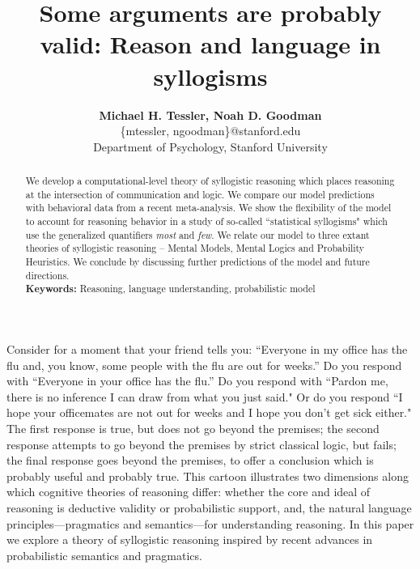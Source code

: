 \documentclass[10pt,letterpaper]{article}
\begin{document}
\title{Some arguments are probably valid: Reason and language in syllogisms}
 
\author{{\large \bf Michael H. Tessler, Noah D. Goodman } \\
	\{mtessler, ngoodman\}@stanford.edu \\
  Department of Psychology, Stanford University}

\maketitle


\begin{abstract}
We develop a computational-level theory of syllogistic reasoning which places reasoning at the intersection of communication and logic. We compare our model predictions with behavioral data from a recent meta-analysis. We show the flexibility of the model to account for reasoning behavior in a study of so-called ``statistical syllogisms" which use the generalized quantifiers \emph{most} and \emph{few}. We relate our model to three extant theories of syllogistic reasoning -- Mental Models, Mental Logics and Probability Heuristics. We conclude by discussing further predictions of the model and future directions.  
\\
\textbf{Keywords:} 
Reasoning, language understanding, probabilistic model
\end{abstract}


Consider for a moment that your friend tells you:
``Everyone in my office has the flu and, you know, some people with the flu are out for weeks.''
Do you respond with
``Everyone in your office has the flu.''
Do you respond with
``Pardon me, there is no inference I can draw from what you just said."
Or do you respond
 ``I hope your officemates are not out for weeks and I hope you don't get sick either."
 The first response is true, but does not go beyond the premises; the second response attempts to go beyond the premises by strict classical logic, but fails; the final response goes beyond the premises, to offer a conclusion which is probably useful and probably true.
% 
This cartoon illustrates two dimensions along which cognitive theories of reasoning differ: whether the core and ideal of reasoning is deductive validity or probabilistic support, and, the natural language principles---pragmatics and semantics---for understanding reasoning. In this paper we explore a theory of syllogistic reasoning inspired by recent advances in probabilistic semantics and pragmatics.
\end{document}
